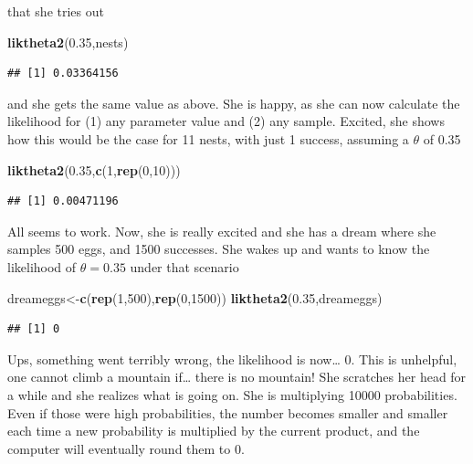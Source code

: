 \documentclass[
]{book}
\newenvironment{Shaded}{\begin{snugshade}}{\end{snugshade}}
\newcommand{\DecValTok}[1]{\textcolor[rgb]{0.00,0.00,0.81}{#1}}
\newcommand{\FloatTok}[1]{\textcolor[rgb]{0.00,0.00,0.81}{#1}}
\newcommand{\FunctionTok}[1]{\textcolor[rgb]{0.13,0.29,0.53}{\textbf{#1}}}
\newcommand{\NormalTok}[1]{#1}
\newcommand{\OtherTok}[1]{\textcolor[rgb]{0.56,0.35,0.01}{#1}}
\begin{document}
that she tries out

\begin{Shaded}
\begin{Highlighting}[]
\FunctionTok{liktheta2}\NormalTok{(}\FloatTok{0.35}\NormalTok{,nests)}
\end{Highlighting}
\end{Shaded}

\begin{verbatim}
## [1] 0.03364156
\end{verbatim}

and she gets the same value as above. She is happy, as she can now calculate the likelihood for (1) any parameter value and (2) any sample. Excited, she shows how this would be the case for 11 nests, with just 1 success, assuming a \(\theta\) of 0.35

\begin{Shaded}
\begin{Highlighting}[]
\FunctionTok{liktheta2}\NormalTok{(}\FloatTok{0.35}\NormalTok{,}\FunctionTok{c}\NormalTok{(}\DecValTok{1}\NormalTok{,}\FunctionTok{rep}\NormalTok{(}\DecValTok{0}\NormalTok{,}\DecValTok{10}\NormalTok{)))}
\end{Highlighting}
\end{Shaded}

\begin{verbatim}
## [1] 0.00471196
\end{verbatim}

All seems to work. Now, she is really excited and she has a dream where she samples 500 eggs, and 1500 successes. She wakes up and wants to know the likelihood of \(\theta=0.35\) under that scenario

\begin{Shaded}
\begin{Highlighting}[]
\NormalTok{dreameggs}\OtherTok{\textless{}{-}}\FunctionTok{c}\NormalTok{(}\FunctionTok{rep}\NormalTok{(}\DecValTok{1}\NormalTok{,}\DecValTok{500}\NormalTok{),}\FunctionTok{rep}\NormalTok{(}\DecValTok{0}\NormalTok{,}\DecValTok{1500}\NormalTok{))}
\FunctionTok{liktheta2}\NormalTok{(}\FloatTok{0.35}\NormalTok{,dreameggs)}
\end{Highlighting}
\end{Shaded}

\begin{verbatim}
## [1] 0
\end{verbatim}

Ups, something went terribly wrong, the likelihood is now\ldots{} 0. This is unhelpful, one cannot climb a mountain if\ldots{} there is no mountain! She scratches her head for a while and she realizes what is going on. She is multiplying 10000 probabilities. Even if those were high probabilities, the number becomes smaller and smaller each time a new probability is multiplied by the current product, and the computer will eventually round them to 0.
\end{document}
